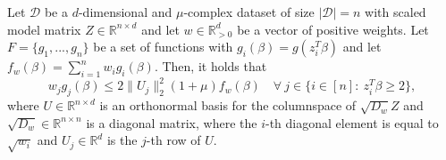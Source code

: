 \begin{lemma}
    \label{lemma:g-bounds-1}
    Let $\mathcal{D}$ be a $d$-dimensional and $\mu$-complex dataset of size
    $|\mathcal{D}|=n$ with scaled model matrix
    $Z \in \mathbb{R}^{n \times d}$ and let $w \in \mathbb{R}^d_{>0}$
    be a vector of positive weights.
    Let $F = \{g_1, ..., g_n\}$ be a set of functions with
    $g_i(\beta) = g(z_i^T \beta)$ and let
    $f_w(\beta) = \sum_{i=1}^n w_ig_i(\beta)$.
    Then, it holds that
    \begin{equation*}
        w_jg_j(\beta) \leq 2 \lVert U_j \rVert_2^2(1 + \mu)f_w(\beta) \quad
        \forall\ j \in \{i \in [n]:\ z_i^T \beta \geq 2 \},
    \end{equation*}
    where $U \in \mathbb{R}^{n \times d}$ is an orthonormal basis for
    the columnspace of $\sqrt{D_w}Z$ and $\sqrt{D_w} \in \mathbb{R}^{n \times n}$
    is a diagonal matrix, where the $i$-th diagonal element is equal to
    $\sqrt{w_i}$ and $U_j \in \mathbb{R}^d$ is the $j$-th row of $U$.
\end{lemma}
